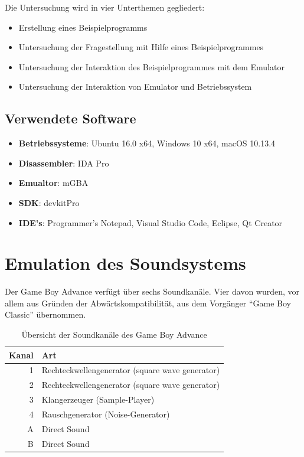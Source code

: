 \documentclass[11pt,a4paper]{scrartcl}
\begin{document}
Die Untersuchung wird in vier Unterthemen gegliedert:

\begin{itemize}
    \item Erstellung eines Beispielprogramms
    \item Untersuchung der Fragestellung mit Hilfe eines Beispielprogrammes
    \item Untersuchung der Interaktion des Beispielprogrammes mit dem Emulator
    \item Untersuchung der Interaktion von Emulator und Betriebssystem
\end{itemize}

\subsection{Verwendete Software}

\begin{itemize}
    \item \textbf{Betriebssysteme}: Ubuntu 16.0 x64, Windows 10 x64, macOS 10.13.4
    \item \textbf{Disassembler}: IDA Pro
    \item \textbf{Emualtor}: mGBA
    \item \textbf{SDK}: devkitPro
    \item \textbf{IDE's}: Programmer's Notepad, Visual Studio Code, Eclipse, Qt Creator
\end{itemize}



\section{Emulation des Soundsystems}

Der Game Boy Advance verf\"ugt \"uber sechs Soundkan\"ale. Vier davon wurden, vor allem aus Gr\"unden der Abw\"artskompatibilit\"at, aus dem Vorg\"anger \enquote{Game Boy Classic} \"ubernommen.

\begin{table}[h]
    \centering
    \begin{tabular}{ r | p{10cm} }
        \textbf{Kanal} & \textbf{Art} \\
        \hline
        1 & Rechteckwellengenerator (square wave generator) \\
        \hline
        2 & Rechteckwellengenerator (square wave generator) \\
        \hline
        3 & Klangerzeuger (Sample-Player) \\
        \hline
        4 & Rauschgenerator (Noise-Generator) \\
        \hline
        A & Direct Sound \\
        \hline
        B & Direct Sound \\
    \end{tabular}
    \caption{\"Ubersicht der Soundkan\"ale des Game Boy Advance}
    \label{table:TechnischeDaten}
\end{table}
\end{document}
